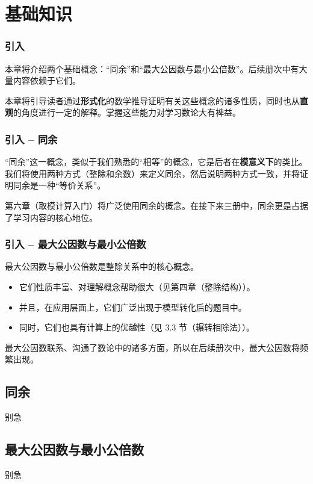
\section{基础知识}
\begin{frame}
  \frametitle{引入}
  本章将介绍两个基础概念：“\alert{同余}”和“\alert{最大公因数与最小公倍数}”。后续册次中有大量内容依赖于它们。
  \begin{center}
    \huge{}
  \end{center}
  \begin{center}
    \huge\fbox{\quad$\gcd$, $\lcm$\quad}
  \end{center}
  \pause
  
  \emptyline
  本章将引导读者通过\textbf{形式化}的数学推导证明有关这些概念的诸多性质，同时也从\textbf{直观}的角度进行一定的解释。掌握这些能力对学习数论大有裨益。
\end{frame}
\begin{frame}
  \frametitle{引入 -- 同余}
  “同余”这一概念，类似于我们熟悉的“相等”的概念，它是后者在\textbf{模意义下}的类比。我们将使用两种方式（整除和余数）来定义同余，然后说明两种方式一致，并将证明同余是一种“等价关系”。
  \pause
  
  \emptyline
  第六章（取模计算入门）将广泛使用同余的概念。在接下来三册中，同余更是占据了学习内容的核心地位。
\end{frame}
\begin{frame}
  \frametitle{引入 -- 最大公因数与最小公倍数}
  最大公因数与最小公倍数是整除关系中的核心概念。
  \pause
  \begin{itemize}
    \item 它们性质丰富、对理解概念帮助很大（见第四章（整除结构））。
    \pause
    \item 并且，在应用层面上，它们广泛出现于模型转化后的题目中。
    \pause
    \item 同时，它们也具有计算上的优越性（见 3.3 节（辗转相除法））。
  \end{itemize}
  \pause
  
  \emptyline
  最大公因数联系、沟通了数论中的诸多方面，所以在后续册次中，最大公因数将频繁出现。
\end{frame}
\subsection{同余}
\begin{frame}[c]
  \progressnow*
\end{frame}
\begin{frame}{别急}\end{frame} %
\subsection{最大公因数与最小公倍数}
\begin{frame}[c]
  \progressnow*
\end{frame}
\begin{frame}{别急}\end{frame} %
